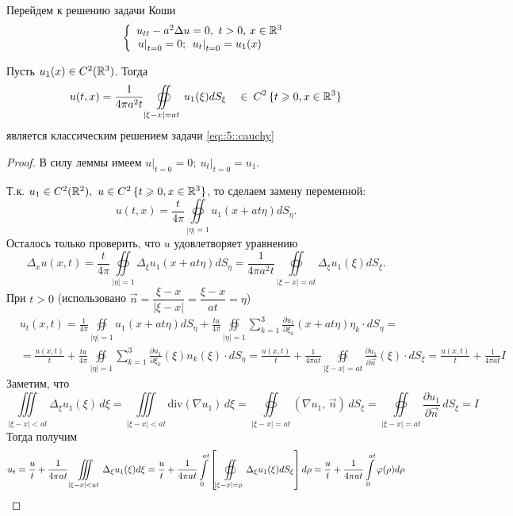 \documentclass[../main.tex]{subfiles}
\begin{document}
Перейдем к решению задачи Коши
\begin{equation}
\left\{
  \begin{array}{ll}
  u_{tt}-a^2\Delta u=0,\ t>0,\, x\in \R^3\\
  \left. u\right|_{t=0}=0;\ \left. u_t\right|_{t=0}=u_1(x)
  \end{array}
\right.
\label{eq::5::cauchy}
\end{equation}
\begin{theorem}
Пусть $u_1(x)\in C^2(\R^3)$. Тогда 
\[
u(t,x)=\frac{1}{4\pi a^2t}\oiint\limits_{|\xi - x|=at}u_1(\xi )dS_{\xi} \quad \in \: C^2\, \{t\geq 0, x\in \R^3 \}
\]
является классическим решением задачи \eqref{eq::5::cauchy}
\end{theorem}
\begin{proof}
В силу леммы имеем $\left. u\right|_{t=0}=0;\ \left. u_t\right|_{t=0}=u_1$.

Т.к. $u_1\in C^2(\R^2),\ u\in C^2\,\{t\geq 0, x\in\R^3\}$, то сделаем замену переменной:
\[
u(t, x)=\frac{t}{4\pi}\oiint\limits_{|\eta |=1}u_1(x+at\eta )dS_{\eta}.
\]
Осталось только проверить, что $u$ удовлетворяет уравнению
\[
\Delta_xu(x, t)=\frac{t}{4\pi}\oiint\limits_{|\eta |=1}\Delta_{\xi}u_1(x+at\eta )dS_{\eta}=\frac{1}{4\pi a^2t}\oiint\limits_{|\xi - x|=at}\Delta_{\xi}u_1(\xi )dS_{\xi}.
\]
При $t>0$ (использовано $\vec{n}=\dfrac{\xi - x}{|\xi - x|}=\dfrac{\xi - x}{at}=\eta$)
\begin{equation*}
\begin{split}
&u_t(x,t)=\frac{1}{4\pi}\oiint\limits_{|\eta |=1}u_1(x+at\eta )dS_{\eta}+\frac{ta}{4\pi}\oiint\limits_{|\eta |=1}\sum\limits_{k=1}^3 \frac{\partial u_1}{\partial \xi_k}(x+at\eta )\eta_k\cdot dS_{\eta}=\\[0.75em]
&=\frac{u(x, t)}{t}+\frac{ta}{4\pi}\oiint\limits_{|\eta |=1}\sum\limits_{k=1}^3 \frac{\partial u_1}{\partial \xi_k}(\xi )n_k(\xi )\cdot dS_{\eta}=\frac{u(x, t)}{t}+\frac{1}{4\pi at}\oiint\limits_{|\xi - x |=at}\frac{\partial u_1}{\partial \vec{n}}(\xi )\cdot dS_{\xi}=\frac{u(x, t)}{t} + \frac{1}{4\pi at}I
\end{split}
\end{equation*}
Заметим, что
\[
\iiint\limits_{|\xi - x|<at}\Delta_{\xi}u_1(\xi)\, d\xi =\iiint\limits_{|\xi - x|<at}\mathrm{div} (\nabla u_1)\, d\xi =\oiint\limits_{|\xi - x|=at} (\nabla u_1,\, \vec{n})\, dS_{\xi }=\oiint\limits_{|\xi - x|=at}\frac{\partial u_1}{\partial\vec{n}}\, dS_{\xi }=I
\]
Тогда получим 
$$
u_t=\frac{u}{t}+\frac{1}{4\pi at}\iiint\limits_{|\xi - x|<at}\Delta_{\xi}u_1(\xi )d\xi \\
= \frac{u}{t}+\frac{1}{4\pi at}\int\limits_0^{at} \left[\oiint\limits_{|\xi - x|=\rho}\Delta_{\xi}u_1(\xi )dS_{\xi}\right]d\rho \\
= \frac{u}{t}+\frac{1}{4\pi at}\int\limits_0^{at}\phi (\rho )d\rho
$$


\end{proof}
\end{document}
